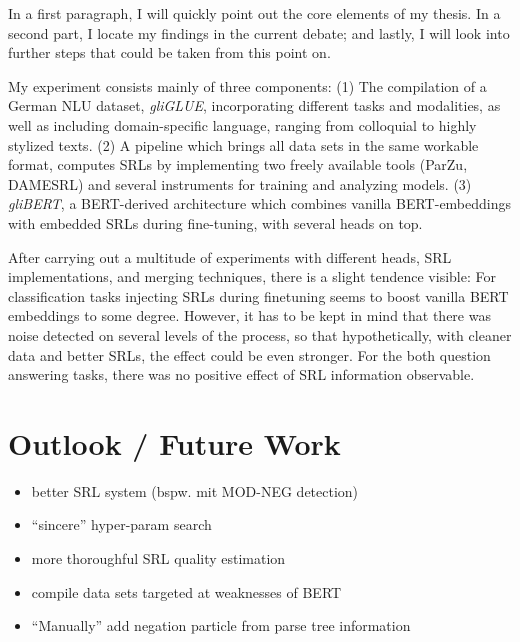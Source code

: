 \label{chap:6_conclusion}


In a first paragraph, I will quickly point out the core elements of my thesis. In a second part, I
locate my findings in the current debate; and lastly, I will look into further steps that could be
taken from this point on.

My experiment consists mainly of three components: (1) The compilation of a German NLU
dataset, \emph{gliGLUE}, incorporating different tasks and modalities, as well as
including domain-specific language, ranging from colloquial to highly stylized texts.
(2) A pipeline which brings all data sets in the same workable format, computes SRLs
by implementing two freely available tools (ParZu, DAMESRL) and several instruments
for training and analyzing models. (3) \emph{gliBERT}, a BERT-derived architecture
which combines vanilla BERT-embeddings with embedded SRLs during fine-tuning, with
several heads on top.

After carrying out a multitude of experiments with different heads, SRL implementations,
and merging techniques, there is a slight tendence visible: For classification tasks
injecting SRLs during finetuning seems to boost vanilla BERT embeddings to some degree.
However, it has to be kept in mind that there was noise detected on several levels of
the process, so that hypothetically, with cleaner data and better SRLs, the effect
could be {\color{red} even stronger}. For the both question answering tasks, there
was no positive effect of SRL information observable.


\section{Outlook / Future Work}



\begin{itemize}
  \item better SRL system (bspw. mit MOD-NEG detection)
  \item ``sincere'' hyper-param search
  \item more thoroughful SRL quality estimation
  \item compile data sets targeted at weaknesses of BERT
  \item ``Manually'' add negation particle from parse tree information
\end{itemize}


